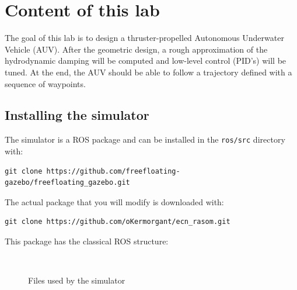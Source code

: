 \documentclass{ecnreport}
\begin{document}


\section{Content of this lab}

The goal of this lab is to design a thruster-propelled Autonomous Underwater Vehicle (AUV). After the geometric design, a rough approximation of the hydrodynamic damping will be computed
and low-level control (PID's) will be tuned. At the end, the AUV should be able to follow a trajectory defined with a sequence of waypoints.

\subsection{Installing the simulator}

The simulator is a ROS package and can be installed in the \texttt{ros/src} directory with:
\begin{center}
\begin{lstlisting}
git clone https://github.com/freefloating-gazebo/freefloating_gazebo.git
\end{lstlisting}
\end{center}

The actual package that you will modify is downloaded with:
\begin{center}
\begin{lstlisting}
git clone https://github.com/oKermorgant/ecn_rasom.git
\end{lstlisting}
\end{center}
This package has the classical ROS structure:
\begin{figure}[h]
\begin{minipage}{.25\linewidth} ~ \end{minipage}
\begin{minipage}{.5\linewidth}
\end{minipage}
\caption{Files used by the simulator}
\end{figure}
\end{document}
